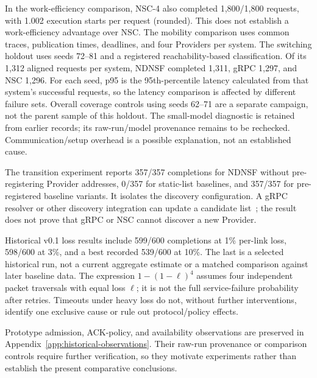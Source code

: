 In the work-efficiency comparison, NSC-4 also completed 1,800/1,800 requests, with 1.002 execution starts per request (rounded). This does not establish a work-efficiency advantage over NSC. The mobility comparison uses common traces, publication times, deadlines, and four Providers per system. The switching holdout uses seeds 72--81 and a registered reachability-based classification. Of its 1,312 aligned requests per system, NDNSF completed 1,311, gRPC 1,297, and NSC 1,296. For each seed, p95 is the 95th-percentile latency calculated from that system's successful requests, so the latency comparison is affected by different failure sets. Overall coverage controls using seeds 62--71 are a separate campaign, not the parent sample of this holdout. The small-model diagnostic is retained from earlier records; its raw-run/model provenance remains to be rechecked. Communication/setup overhead is a possible explanation, not an established cause.

The transition experiment reports 357/357 completions for NDNSF without pre-registering Provider addresses, 0/357 for static-list baselines, and 357/357 for pre-registered baseline variants. It isolates the discovery configuration. A gRPC resolver or other discovery integration can update a candidate list~\cite{grpcresolver}; the result does not prove that gRPC or NSC cannot discover a new Provider.

Historical v0.1 loss results include 599/600 completions at 1\% per-link loss, 598/600 at 3\%, and a best recorded 539/600 at 10\%. The last is a selected historical run, not a current aggregate estimate or a matched comparison against later baseline data. The expression $1-(1-\ell)^4$ assumes four independent packet traversals with equal loss $\ell$; it is not the full service-failure probability after retries. Timeouts under heavy loss do not, without further interventions, identify one exclusive cause or rule out protocol/policy effects.

Prototype admission, ACK-policy, and availability observations are preserved in Appendix~\ref{app:historical-observations}. Their raw-run provenance or comparison controls require further verification, so they motivate experiments rather than establish the present comparative conclusions.

